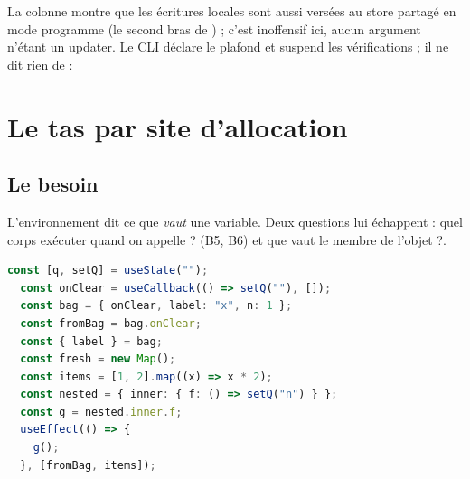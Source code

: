 La colonne  montre que les écritures locales sont aussi versées
au store partagé en mode programme (le second bras de
) ; c'est inoffensif ici, aucun argument n'étant un
updater. Le CLI déclare le plafond et suspend les vérifications ; il ne dit
rien de  :


\section{Le tas par site d'allocation}
\label{sec:transfert-stores-tas}

\subsection{Le besoin}

L'environnement dit ce que \emph{vaut} une variable. Deux questions lui
échappent : \og quel corps exécuter quand on appelle  ?\fg{} (B5,
B6) et \og que vaut le membre  de l'objet  ?\fg{}.

\begin{lstlisting}[language=TypeScript,caption={Membres, sites et fermetures (\file{/tmp/ch11/ex10.tsx}, extrait du corps de \code{Heapy})},label={lst:transfert-stores-heapy}]
  const [q, setQ] = useState("");
  const onClear = useCallback(() => setQ(""), []);
  const bag = { onClear, label: "x", n: 1 };
  const fromBag = bag.onClear;
  const { label } = bag;
  const fresh = new Map();
  const items = [1, 2].map((x) => x * 2);
  const nested = { inner: { f: () => setQ("n") } };
  const g = nested.inner.f;
  useEffect(() => {
    g();
  }, [fromBag, items]);
\end{lstlisting}

